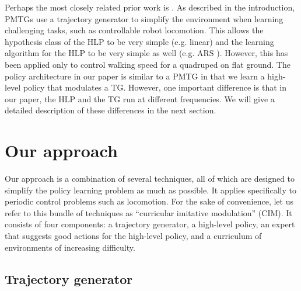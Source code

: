 \documentclass[a4paper]{article}
\newcommand{\nhatch}[1]{{\leavevmode\color{magenta} Nathan: #1}}
\begin{document}
Perhaps the most closely related prior work is \citet{iscen2018pmtg}.
As described in the introduction, PMTGs use a trajectory generator to simplify the environment when learning challenging tasks, such as controllable robot locomotion.
This allows the hypothesis class of the HLP to be very simple (e.g. linear) and the learning algorithm for the HLP to be very simple as well (e.g. ARS \citep{mania2018simple}).
However, this has been applied only to control walking speed for a quadruped on flat ground.
The policy architecture in our paper is similar to a PMTG in that we learn a high-level policy that modulates a TG.
However, one important difference is that in our paper, the HLP and the TG run at different frequencies.
We will give a detailed description of these differences in the next section.


\section{Our approach} \label{sec:approach}

Our approach is a combination of several techniques, all of which are designed to simplify the policy learning problem as much as possible.
It applies specifically to periodic control problems such as locomotion.
For the sake of convenience, let us refer to this bundle of techniques as ``curricular imitative modulation'' (CIM).
It consists of four components: a trajectory generator, a high-level policy, an expert that suggests good actions for the high-level policy, and a curriculum of environments of increasing difficulty.


\subsection{Trajectory generator} \label{sec:tg}
\end{document}
